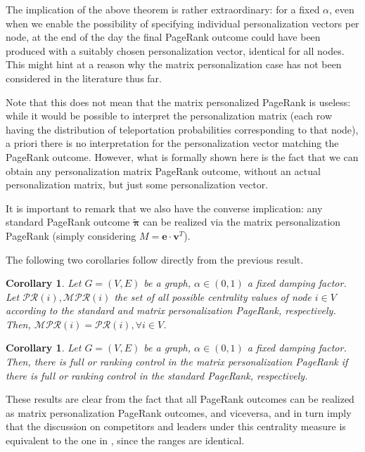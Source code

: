\documentclass[sn-mathphys-ay]{sn-jnl}%
\newcommand{\bv}{\bm{v}}
\newcommand{\be}{\mathbf{e}}
\theoremstyle{thmstyleone}%
\theoremstyle{thmstyletwo}%
\newtheorem{corollary}[theorem]{Corollary}
\theoremstyle{thmstylethree}%
\begin{document}
The implication of the above theorem is rather extraordinary: for a fixed $\alpha$, even when we enable the possibility of specifying individual personalization vectors per node, at the end of the day the final PageRank outcome could have been produced with a suitably chosen personalization vector, identical for all nodes. This might hint at a reason why the matrix personalization case has not been considered in the literature thus far.

Note that this does not mean that the matrix personalized PageRank is useless: while it would be possible to interpret the personalization matrix (each row having the distribution of teleportation probabilities corresponding to that node), a priori there is no interpretation for the personalization vector matching the PageRank outcome. However, what is formally shown here is the fact that we can obtain any personalization matrix PageRank outcome, without an actual personalization matrix, but just some personalization vector.

It is important to remark that we also have the converse implication: any standard PageRank outcome $\widetilde{\bm{\pi}}$ can be realized via the matrix personalization PageRank (simply considering $M=\be\cdot \bv^T$). 


The following two corollaries follow directly from the previous result.
\begin{corollary}
Let $G=(V,E)$ be a graph, $\alpha\in(0,1)$ a fixed damping factor. Let $\mathcal{PR}(i), \mathcal{MPR}(i)$ the set of all possible centrality values of node $i\in V$ according to the standard and matrix personalization PageRank, respectively. Then, $\mathcal{MPR}(i) = \mathcal{PR}(i),\forall i\in V$.	
\end{corollary}


\begin{corollary}
	Let $G=(V,E)$ be a graph, $\alpha\in(0,1)$ a fixed damping factor. Then, there is full or ranking control in the matrix personalization PageRank if there is full or ranking control in the standard PageRank, respectively. 
\end{corollary}

These results are clear from the fact that all PageRank outcomes can be realized as matrix personalization PageRank outcomes, and viceversa, and in turn imply that the discussion on competitors and leaders under this centrality measure is equivalent to the one in \cite{garcia2012localization}, since the ranges are identical.
\end{document}
